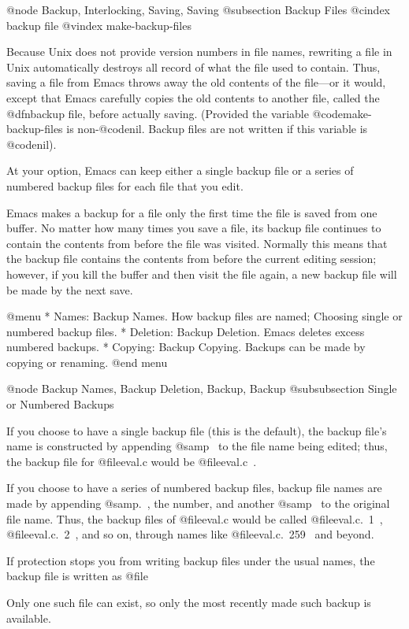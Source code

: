 {{{{{{{{{{{{{{{{{{{{@node Backup, Interlocking, Saving, Saving
@subsection Backup Files
@cindex backup file
@vindex make-backup-files

  Because Unix does not provide version numbers in file names, rewriting a
file in Unix automatically destroys all record of what the file used to
contain.  Thus, saving a file from Emacs throws away the old contents of
the file---or it would, except that Emacs carefully copies the old contents
to another file, called the @dfn{backup} file, before actually saving.
(Provided the variable @code{make-backup-files} is non-@code{nil}.
Backup files are not written if this variable is @code{nil}).

  At your option, Emacs can keep either a single backup file or a series of
numbered backup files for each file that you edit.

  Emacs makes a backup for a file only the first time the file is saved
from one buffer.  No matter how many times you save a file, its backup file
continues to contain the contents from before the file was visited.
Normally this means that the backup file contains the contents from before
the current editing session; however, if you kill the buffer and then visit
the file again, a new backup file will be made by the next save.

@menu
* Names: Backup Names.		How backup files are named;
				Choosing single or numbered backup files.
* Deletion: Backup Deletion.	Emacs deletes excess numbered backups.
* Copying: Backup Copying.	Backups can be made by copying or renaming.
@end menu

@node Backup Names, Backup Deletion, Backup, Backup
@subsubsection Single or Numbered Backups

  If you choose to have a single backup file (this is the default),
the backup file's name is constructed by appending @samp{~} to the
file name being edited; thus, the backup file for @file{eval.c} would
be @file{eval.c~}.

  If you choose to have a series of numbered backup files, backup file
names are made by appending @samp{.~}, the number, and another @samp{~} to
the original file name.  Thus, the backup files of @file{eval.c} would be
called @file{eval.c.~1~}, @file{eval.c.~2~}, and so on, through names
like @file{eval.c.~259~} and beyond.

  If protection stops you from writing backup files under the usual names,
the backup file is written as @file{%
Only one such file can exist, so only the most recently made such backup is
available.

}}}}}}}}}}}}}}}}}}}}}
